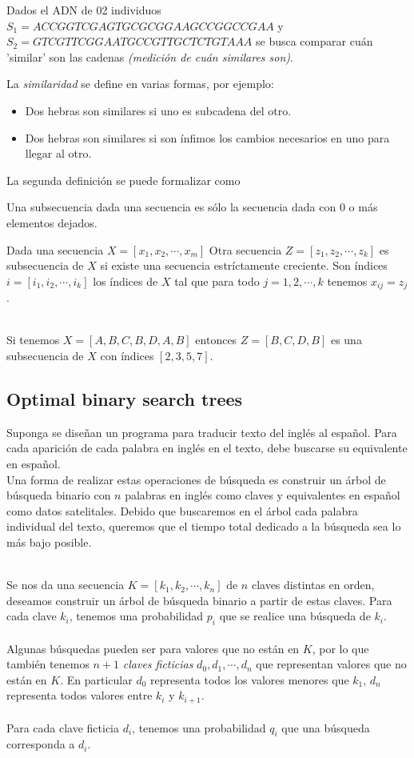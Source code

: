 \documentclass[tikz,11pt,fleqn]{book} %
\begin{document}
Dados el ADN de 02 individuos $S_1=ACCGGTCGAGTGCGCGGAAGCCGGCCGAA$ y $S_2=GTCGTTCGGAATGCCGTTGCTCTGTAAA$ se busca comparar cuán 'similar' son las cadenas \textit{(medición de cuán similares son)}.

La \textit{similaridad} se define en varias formas, por ejemplo:
\begin{itemize}
	\item Dos hebras son similares si uno es subcadena del otro.
	\item Dos hebras son similares si son ínfimos los cambios necesarios en uno para llegar al otro.
\end{itemize}
La segunda definición se puede formalizar como
\begin{definition}[Formalmente]
	Una subsecuencia dada una secuencia es sólo la secuencia dada con 0 o más elementos dejados.

	Dada una secuencia $X=[x_1,x_2,\cdots,x_m]$
	Otra secuencia $Z=[z_1,z_2,\cdots,z_k]$ es subsecuencia de $X$ si existe una secuencia estríctamente creciente.
	Son índices $i=[i_1,i_2,\cdots,i_k]$ los índices de $X$ tal que para todo $j=1,2,\cdots,k$ tenemos $x_{ij}=z_j$.
\end{definition}
\begin{example}[]~\\
	Si tenemos $X=[A,B,C,B,D,A,B]$ entonces $Z=[B,C,D,B]$ es una subsecuencia de $X$ con índices $[2,3,5,7]$.
\end{example}


\subsection{Optimal binary search trees}
Suponga se diseñan un programa para traducir texto del inglés al español.
Para cada aparición de cada palabra en inglés en el texto, debe buscarse su equivalente en español.\\
Una forma de realizar estas operaciones de búsqueda es construir un árbol de búsqueda binario con $n$ palabras en inglés como claves y equivalentes en español como datos satelitales.
Debido que buscaremos en el árbol cada palabra individual del texto, queremos que el tiempo total dedicado a la búsqueda sea lo más bajo posible.

\begin{definition}[Formalmente]~\\
	Se nos da una secuencia $K=[k_1,k_2,\cdots,k_n]$ de $n$ claves distintas en orden, deseamos construir un árbol de búsqueda binario a partir de estas claves. Para cada  clave $k_i$, tenemos una probabilidad $p_i$ que se realice una búsqueda de $k_i$.\\\\
	Algunas búsquedas pueden ser para valores que no están en $K$, por lo que también tenemos $n+1$ \textit{claves ficticias} $d_0,d_1,\cdots,d_n$ que representan valores que no están en $K$. En particular $d_0$ representa todos los valores menores que $k_1$, $d_n$ representa todos valores entre $k_i$ y $k_{i+1}$.\\\\
	Para cada clave ficticia $d_i$, tenemos una probabilidad $q_i$ que una búsqueda corresponda a $d_i$.
\end{definition}
\end{document}
